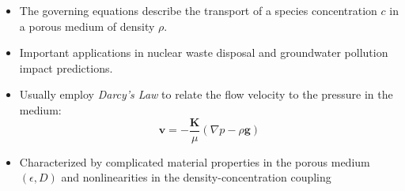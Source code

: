 \documentclass[compress,12pt]{beamer}
\newcommand{\bv}[1]{{\boldsymbol{#1}}}
\begin{document}
\begin{frame}
    \begin{itemize}
    \item The governing equations describe the transport of a species concentration $c$
      in a porous medium of density $\rho$.
    \item Important applications in nuclear waste disposal and groundwater pollution
      impact predictions.
    \item Usually employ \emph{Darcy's Law} to relate the flow velocity
      to the pressure in the medium:
      \begin{equation}
	\bv{v} = - \frac{\bv{K}}{\mu} \left( \nabla p - \rho \bv{g}
	\right)
	\nonumber
      \end{equation}
    \item Characterized by complicated material properties in the
      porous medium $(\epsilon, D)$ and nonlinearities in the density-concentration coupling
  \end{itemize}
\end{frame}



\end{document}
